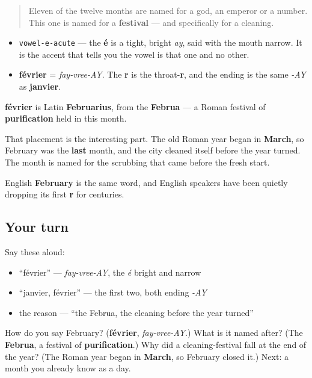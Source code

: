\begin{quote}
Eleven of the twelve months are named for a god, an emperor or a number. This one is named for a \textbf{festival} — and specifically for a cleaning.
\end{quote}

\begin{sounds}
\begin{itemize}
\raggedright
  \item \texttt{vowel-e-acute} — the \textbf{é} is a tight, bright \emph{ay}, said with the mouth narrow. It is the accent that tells you the vowel is that one and no other.
  \item \textbf{février} = \emph{fay-vree-AY}. The \textbf{r} is the throat-\textbf{r}, and the ending is the same \emph{-AY} as \textbf{janvier}.
\end{itemize}
\end{sounds}

\begin{culture}
\textbf{février} is Latin \textbf{Februarius}, from the \textbf{Februa} — a Roman festival of \textbf{purification} held in this month.

That placement is the interesting part. The old Roman year began in \textbf{March}, so February was the \textbf{last} month, and the city cleaned itself before the year turned. The month is named for the scrubbing that came before the fresh start.

English \textbf{February} is the same word, and English speakers have been quietly dropping its first \textbf{r} for centuries.
\end{culture}

\subsection*{Your turn}
Say these aloud:

\begin{itemize}
\raggedright
  \item \textquotedblleft{}février\textquotedblright{} — \emph{fay-vree-AY}, the \emph{é} bright and narrow
  \item \textquotedblleft{}janvier, février\textquotedblright{} — the first two, both ending \emph{-AY}
  \item the reason — \textquotedblleft{}the Februa, the cleaning before the year turned\textquotedblright{}
\end{itemize}

\begin{tcolorbox}[breakable,colback=teal!4,colframe=teal!35!black,title={Before you move on}]
How do you say February? (\textbf{février}, \emph{fay-vree-AY}.) What is it named after? (The \textbf{Februa}, a festival of \textbf{purification}.) Why did a cleaning-festival fall at the end of the year? (The Roman year began in \textbf{March}, so February closed it.) Next: a month you already know as a day.
\end{tcolorbox}
